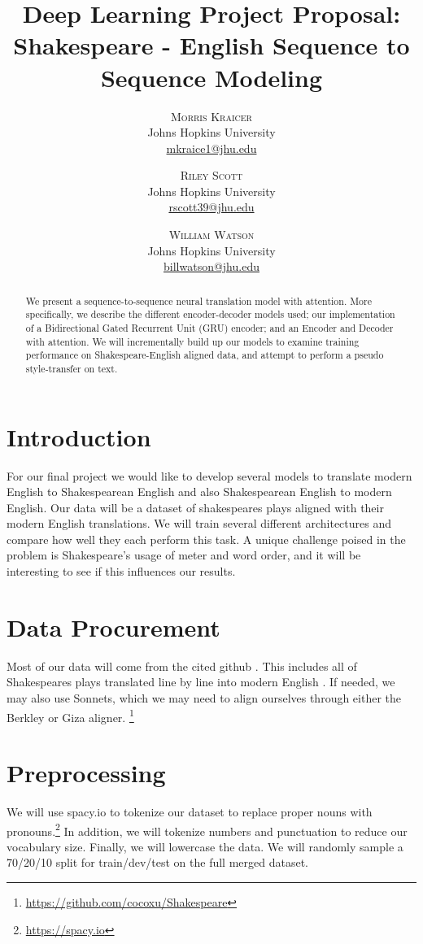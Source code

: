 \documentclass[twoside,twocolumn]{article}
\title{Deep Learning Project Proposal:\\Shakespeare - English Sequence to Sequence Modeling}
\author{%
\textsc{Morris Kraicer} \\[1ex]
\normalsize Johns Hopkins University \\
\normalsize \href{mailto:mkraice1@jhu.edu}{mkraice1@jhu.edu}
 \and
 \textsc{Riley Scott} \\[1ex]
\normalsize Johns Hopkins University \\
\normalsize \href{mailto:rscott39@jhu.edu}{rscott39@jhu.edu}
 \and
  \textsc{William Watson} \\[1ex]
\normalsize Johns Hopkins University \\
\normalsize \href{mailto:billwatson@jhu.edu}{billwatson@jhu.edu}
}
\date{}%
\begin{document}
\maketitle



\begin{abstract}
\noindent
We present a sequence-to-sequence neural translation model with attention.
More specifically, we describe the different encoder-decoder models used; our
implementation of a Bidirectional Gated Recurrent Unit (GRU) encoder; and an
Encoder and Decoder with attention. We will incrementally build up our models
to examine training performance on Shakespeare-English aligned data, and
attempt to perform a pseudo style-transfer on text.
\end{abstract}

\section{Introduction}
For our final project we would like to develop several models to translate
modern English to Shakespearean English and also Shakespearean English to
modern English. Our data will be a dataset of shakespeares plays aligned with
their modern English translations. We will train several different
architectures and compare how well they each perform this task. A unique
challenge poised in the problem is Shakespeare's usage of meter and word order,
and it will be interesting to see if this influences our results.

\section{Data Procurement}
Most of our data will come from the cited github \cite{xu2012paraphrasing}.
This includes all of Shakespeares plays translated line by line into modern
English . If needed, we may also use Sonnets, which we may need to align
ourselves through either the Berkley or Giza aligner.
\footnote{\url{https://github.com/cocoxu/Shakespeare}}

\section{Preprocessing}
We will use spacy.io to tokenize our dataset to replace proper nouns with
pronouns.\footnote{\url{https://spacy.io}} In addition, we will tokenize numbers
and punctuation to reduce our vocabulary size. Finally, we will lowercase the
data. We will randomly sample a 70/20/10 split for train/dev/test on the full
merged dataset.
\end{document}

